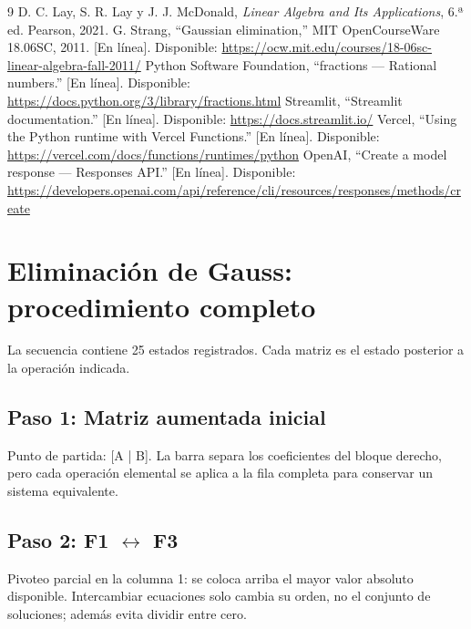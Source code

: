 \documentclass[conference]{IEEEtran}
\begin{document}
\begin{thebibliography}{9}
 D. C. Lay, S. R. Lay y J. J. McDonald, \emph{Linear Algebra and Its Applications}, 6.ª ed. Pearson, 2021.
 G. Strang, ``Gaussian elimination,'' MIT OpenCourseWare 18.06SC, 2011. [En línea]. Disponible: \url{https://ocw.mit.edu/courses/18-06sc-linear-algebra-fall-2011/}
 Python Software Foundation, ``fractions --- Rational numbers.'' [En línea]. Disponible: \url{https://docs.python.org/3/library/fractions.html}
 Streamlit, ``Streamlit documentation.'' [En línea]. Disponible: \url{https://docs.streamlit.io/}
 Vercel, ``Using the Python runtime with Vercel Functions.'' [En línea]. Disponible: \url{https://vercel.com/docs/functions/runtimes/python}
 OpenAI, ``Create a model response --- Responses API.'' [En línea]. Disponible: \url{https://developers.openai.com/api/reference/cli/resources/responses/methods/create}
\end{thebibliography}

\clearpage\onecolumn\appendices
\section{Eliminación de Gauss: procedimiento completo}
La secuencia contiene 25 estados registrados. Cada matriz es el estado posterior a la operación indicada.
\subsection*{Paso 1: Matriz aumentada inicial}
Punto de partida: [A | B]. La barra separa los coeficientes del bloque derecho, pero cada operación elemental se aplica a la fila completa para conservar un sistema equivalente.


\medskip
\subsection*{Paso 2: F1 \(\leftrightarrow\) F3}
Pivoteo parcial en la columna 1: se coloca arriba el mayor valor absoluto disponible. Intercambiar ecuaciones solo cambia su orden, no el conjunto de soluciones; además evita dividir entre cero.
\end{document}
